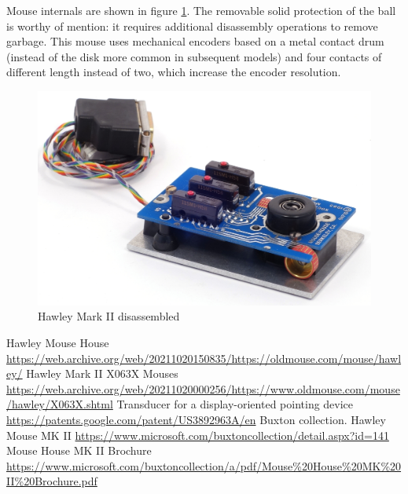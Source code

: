 \documentclass[11pt, a4paper]{article}
\begin{document}
Mouse internals are shown in figure \ref{fig:HawleyMarkIIInside}. The removable solid protection of the ball is worthy of mention: it requires additional disassembly operations to remove garbage. This mouse uses mechanical encoders  based on a metal contact drum (instead of the disk  more common in subsequent models) and four contacts of different length instead of two, which increase the encoder resolution.

 \begin{figure}[h]
    \centering
    \includegraphics[scale=0.8]{1982_hawley_mark_ii/inside_60.jpg}
    \caption{Hawley Mark II disassembled}
    \label{fig:HawleyMarkIIInside}
\end{figure}

\begin{thebibliography}{9}
 Hawley Mouse House \url{https://web.archive.org/web/20211020150835/https://oldmouse.com/mouse/hawley/}
 Hawley Mark II X063X Mouses \url{https://web.archive.org/web/20211020000256/https://www.oldmouse.com/mouse/hawley/X063X.shtml}
 Transducer for a display-oriented pointing device \url{https://patents.google.com/patent/US3892963A/en}
 Buxton collection. Hawley Mouse MK II \url{https://www.microsoft.com/buxtoncollection/detail.aspx?id=141}
 Mouse House MK II Brochure \url{https://www.microsoft.com/buxtoncollection/a/pdf/Mouse%20House%20MK%20II%20Brochure.pdf}
\end{thebibliography}
\end{document}
